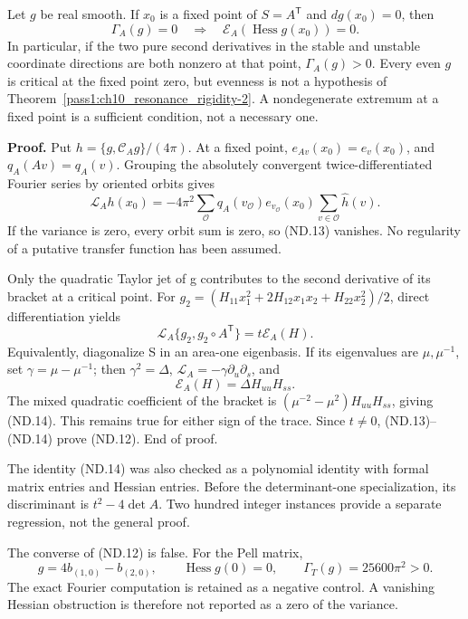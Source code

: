 \begin{theorem}\label{pass1:ch10_resonance_rigidity-2} Let \(g\) be real smooth. If \(x_0\) is a fixed point of \(S=A^{\mathsf T}\) and \(dg(x_0)=0\), then \[
 \boxed{\Gamma_A(g)=0\quad\Longrightarrow\quad
                   \mathcal E_A(\operatorname{Hess}g(x_0))=0.} \tag{ND.12}
\] In particular, if the two pure second derivatives in the stable and unstable coordinate directions are both nonzero at that point, \(\Gamma_A(g)>0\). Every even \(g\) is critical at the fixed point zero, but evenness is not a hypothesis of Theorem~\ref{pass1:ch10_resonance_rigidity-2}. A nondegenerate extremum at a fixed point is a sufficient condition, not a necessary one.
\end{theorem}

\textbf{Proof.} Put \(h=\{g,\mathcal C_Ag\}/(4\pi)\). At a fixed point, \(e_{Av}(x_0)=e_v(x_0)\), and \(q_A(Av)=q_A(v)\). Grouping the absolutely convergent twice-differentiated Fourier series by oriented orbits gives \[
 \mathcal L_Ah(x_0)
 =-4\pi^2\sum_{\mathcal O}q_A(v_{\mathcal O})e_{v_{\mathcal O}}(x_0)
                       \sum_{v\in\mathcal O}\widehat h(v).
 \tag{ND.13}
\] If the variance is zero, every orbit sum is zero, so (ND.13) vanishes. No regularity of a putative transfer function has been assumed.

Only the quadratic Taylor jet of g contributes to the second derivative of its bracket at a critical point. For \(g_2=(H_{11}x_1^2+2H_{12}x_1x_2+H_{22}x_2^2)/2\), direct differentiation yields \[
 \mathcal L_A\{g_2,g_2\circ A^{\mathsf T}\}
                         =t\mathcal E_A(H).                \tag{ND.14}
\] Equivalently, diagonalize S in an area-one eigenbasis. If its eigenvalues are \(\mu,\mu^{-1}\), set \(\gamma=\mu-\mu^{-1}\); then \(\gamma^2=\Delta\), \(\mathcal L_A=-\gamma\partial_u\partial_s\), and \[
 \mathcal E_A(H)=\Delta H_{uu}H_{ss}.
 \tag{ND.15}
\] The mixed quadratic coefficient of the bracket is \((\mu^{-2}-\mu^2)H_{uu}H_{ss}\), giving (ND.14). This remains true for either sign of the trace. Since \(t\ne0\), (ND.13)--(ND.14) prove (ND.12). End of proof.

The identity (ND.14) was also checked as a polynomial identity with formal matrix entries and Hessian entries. Before the determinant-one specialization, its discriminant is \(t^2-4\det A\). Two hundred integer instances provide a separate regression, not the general proof.

The converse of (ND.12) is false. For the Pell matrix, \[
 g=4b_{(1,0)}-b_{(2,0)},\qquad \operatorname{Hess}g(0)=0,
 \qquad \Gamma_T(g)=25600\pi^2>0.                            \tag{ND.16}
\] The exact Fourier computation is retained as a negative control. A vanishing Hessian obstruction is therefore not reported as a zero of the variance.

